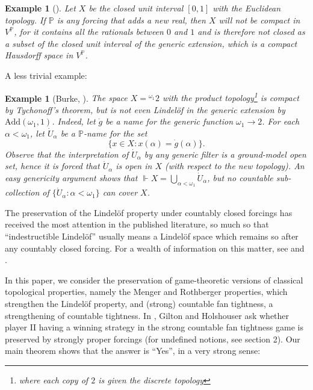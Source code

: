 \documentclass{amsart}
\newtheorem{example}[theorem]{Example}
\theoremstyle{definition}
\newcommand{\bb}{\mathbb}
\newcommand{\Add}{\mathrm{Add}}
\renewcommand{\P}{\bb{P}}
\begin{document}
\begin{example}[{\cite[Example 4.1]{giltonPreservationTopologicalProperties2025}}]
Let $X$ be the closed unit interval $[0,1]$ with the Euclidean topology. If $\P$ is any forcing that adds a new real, then $X$ will not be compact in $V^\P$, for it contains all the rationals between $0$ and $1$ and is therefore not closed as a subset of the closed unit interval of the generic extension, which is a compact Hausdorff space in $V^\P$.
\end{example}

A less trivial example:

\begin{example}[Burke, {\cite[Theorem 17]{tallCardinalityLindelofSpaces1995}}]\label{X}
The space $X={}^{\omega_1} 2$ with the product topology\footnote{where each copy of $2$ is given the discrete topology} is compact by Tychonoff's theorem, but is not even Lindel\"of in the generic extension by $\Add(\omega_1,1)$. Indeed, let $\dot g$ be a name for the generic function $\omega_1\to 2$. For each $\alpha<\omega_1$, let $\dot U_\alpha$ be a $\P$-name for the set
\[
\{x\in X:x(\alpha) = \dot g(\alpha)\}.
\]
Observe that the interpretation of $\dot U_\alpha$ by any generic filter is a ground-model open set, hence it is forced that $\dot U_\alpha$ is open in $X$ (with respect to the new topology). An easy genericity argument shows that $\Vdash X=\bigcup_{\alpha<\omega_1}\dot U_\alpha$, but no countable sub-collection of $\{\dot U_\alpha:\alpha<\omega_1\}$ can cover $X$.
\end{example}

The preservation of the Lindel\"of property under countably closed forcings has received the most attention in the published literature, so much so that ``indestructible Lindel\"of'' usually means a Lindel\"of space which remains so after any countably closed forcing. For a wealth of information on this matter, see \cite{tallCardinalityLindelofSpaces1995} and \cite{scheepersLindelofIndestructibilityTopological2010}.

In this paper, we consider the preservation of game-theoretic versions of classical topological 
properties, namely the Menger and Rothberger properties, which strengthen the Lindel\"{o}f 
property, and (strong) countable fan tightness, a strengthening of countable tightness.
In \cite[Question 8.1]{giltonPreservationTopologicalProperties2025}, Gilton and Holshouser ask whether player II having a winning strategy in the strong countable fan tightness game is preserved by strongly proper forcings (for undefined notions, see section 2). Our main theorem shows that the answer is ``Yes'', in a very strong sense:
\end{document}
